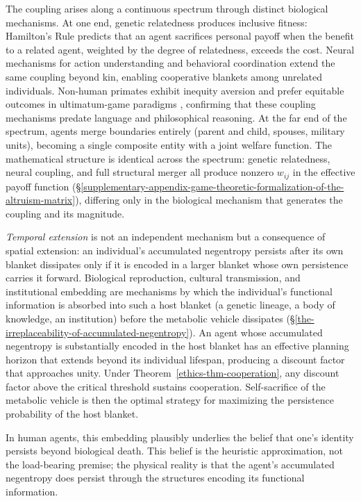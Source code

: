 \documentclass[11pt]{article}
\theoremstyle{plain}
\theoremstyle{definition}
\theoremstyle{remark}
\begin{document}
The coupling arises along a continuous spectrum through distinct
biological mechanisms. At one end, genetic relatedness produces
inclusive fitness: Hamilton's Rule \citep{Hamilton1964a} predicts that
an agent sacrifices personal payoff when the benefit to a related agent,
weighted by the degree of relatedness, exceeds the cost. Neural
mechanisms for action understanding and behavioral coordination
\citep{Rizzolatti2004, deWaal2008} extend the same coupling beyond kin,
enabling cooperative blankets among unrelated individuals. Non-human
primates exhibit inequity aversion \citep{BrosnanDeWaal2003} and prefer
equitable outcomes in ultimatum-game paradigms
\citep{ProctorEtAl2013, deWaal2006}, confirming that these coupling
mechanisms predate language and philosophical reasoning. At the far end
of the spectrum, agents merge boundaries entirely (parent and child,
spouses, military units), becoming a single composite entity with a
joint welfare function. The mathematical structure is identical across
the spectrum: genetic relatedness, neural coupling, and full structural
merger all produce nonzero \(w_{ij}\) in the effective payoff function
(§\ref{supplementary-appendix-game-theoretic-formalization-of-the-altruism-matrix}),
differing only in the biological mechanism that generates the coupling
and its magnitude.

\emph{Temporal extension} is not an independent mechanism but a
consequence of spatial extension: an individual's accumulated negentropy
persists after its own blanket dissipates only if it is encoded in a
larger blanket whose own persistence carries it forward. Biological
reproduction, cultural transmission, and institutional embedding are
mechanisms by which the individual's functional information is absorbed
into such a host blanket (a genetic lineage, a body of knowledge, an
institution) before the metabolic vehicle dissipates
(§\ref{the-irreplaceability-of-accumulated-negentropy}). An agent whose
accumulated negentropy is substantially encoded in the host blanket has
an effective planning horizon that extends beyond its individual
lifespan, producing a discount factor that approaches unity. Under
Theorem~\ref{ethics-thm-cooperation}, any discount factor above the
critical threshold sustains cooperation. Self-sacrifice of the metabolic
vehicle is then the optimal strategy for maximizing the persistence
probability of the host blanket.

In human agents, this embedding plausibly underlies the belief that
one's identity persists beyond biological death. This belief is the
heuristic approximation, not the load-bearing premise; the physical
reality is that the agent's accumulated negentropy does persist through
the structures encoding its functional information.
\end{document}
